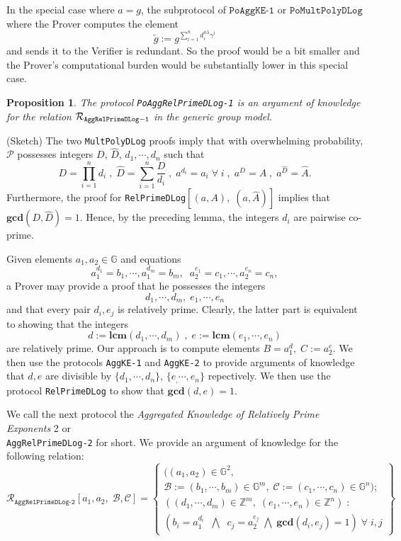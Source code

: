 \documentclass[11pt, lettersize, notitlepage, leqno, footskip=0.6cm]{article}
\newcommand{\bz}{\mathbb Z}
\newcommand{\pl}{\prod\limits}
\newcommand{\slim}{\sum\limits}
\newcommand{\ttt}{\texttt}
\newcommand{\wti}{\widetilde}
\newcommand{\mc}{\mathcal}
\newcommand{\mb}{\mathbb}
\newcommand{\mbf}{\mathbf}
\newcommand{\lam}{\lambda}
\newcommand{\what}{\widehat}
\newcommand{\mP}{\mc{P}}
\newcommand{\vs}{\vspace{-0.15cm}}
\newcommand{\noin}{\noindent}
\newcommand{\op}{overwhelming probability}
\newcommand{\LCM}{\mbf{lcm}}
\newcommand{\GCD}{\mbf{gcd}}
\newtheorem{Prop}[Thm]{Proposition}
\numberwithin{equation}{section}
\begin{document}
In the special case where $a = g$, the subprotocol of $\ttt{PoAggKE-1}$ or $\ttt{PoMultPolyDLog}$ where the Prover computes the element \vs $$\wti{g}:= g^{\slim_{i=1}^n d_i^{n\lam}\gamma^i}$$ and sends it to the Verifier is redundant. So the proof would be a bit smaller and the Prover's computational burden would be substantially lower in this special case. \vspace{0.2cm}

\begin{Prop} The protocol \verb|PoAggRelPrimeDLog-1| is an argument of knowledge for the relation $\mc{R}_{\tt{AggRelPrimeDLog-1}}$ in the generic group model.\end{Prop}

\begin{prf} (Sketch) The two \verb|MultPolyDLog| proofs imply that with \op, $\mP$ possesses integers $D$, $\what{D}$, $d_1,\cdots,d_n$ such that \vs $$D = \pl_{i=1}^n d_i\;,\;\what{D} = \slim_{i=1}^n \frac{D}{d_i}   \;,\;a^{d_i} = a_i\;\forall\;i \;,\;a^{D} = A\;,\; a^{\what{D}} = \what{A} .$$ Furthermore, the proof for \verb|RelPrimeDLog|$[(a,A),\;(a,\what{A})]$ implies that $\GCD(D,\what{D}) = 1$. Hence, by the preceding lemma, the integers $d_i$ are pairwise co-prime.\end{prf}



\bigskip

\noin Given elements $a_1, a_2\in \mb{G}$ and equations \vspace{-0.15cm}$$a_1^{d_1} = b_1,\cdots, a_1^{d_m}= b_m,\;\; a_2^{e_1} = c_1,\cdots, a_2^{e_n} = c_n,$$ a Prover may provide a proof that he possesses the integers \vs $$d_1,\cdots, d_m,\;e_1,\cdots, e_n$$ and that every pair $d_i, e_j$ is relatively prime. Clearly, the latter part is equivalent to showing that the integers \vs $$d:=\LCM(d_1,\cdots, d_m)\;,\;e:=\LCM(e_1,\cdots, e_n)$$ are relatively prime. Our approach is to compute elements $B = a_1^d,\;C:= a_2^{e}$. We then use the protocols \verb|AggKE-1| and \verb|AggKE-2| to provide arguments of knowledge that $d, e$ are divisible by $\{d_1,\cdots, d_n \}$, $\{e_,\cdots,e_n \}$ repectively. We then  use the protocol \verb|RelPrimeDLog| to show that $\GCD(d, e) = 1$.


We call the next protocol the \textit{Aggregated Knowledge of Relatively Prime Exponents} 2 or\\ \verb|AggRelPrimeDLog-2| for short. We provide an argument of knowledge for the following relation: \[
  \mc{R}_{\ttt{AggRelPrimeDLog-2}}[a_1, a_2,\; \mc{B}, \mc{C}] = \left\{\begin{array}{l}
    ((a_1,a_2)\in\mb{G}^2,\;\\
     \mc{B}:=(b_1,\cdots, b_m)\in\mb{G}^m,\;\mc{C}:= (c_1,\cdots, c_n)\in\mb{G}^n);\\
    ((d_1,\cdots,d_m)\in\bz^m,\; (e_1,\cdots,e_n)\in\bz^n)\;: \\
    (b_i = a_1^{d_i}\;\;\bigwedge\;\; c_j = a_2^{e_j}\;\bigwedge\; \GCD(d_i, e_j) = 1)\;\forall \;i,j   	
  \end{array}\right\}
\] 
\end{document}
